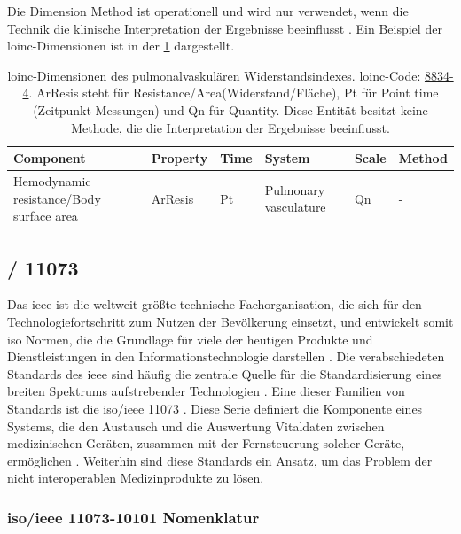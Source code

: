 Die Dimension \glqq Method\grqq{} ist operationell und wird nur verwendet, wenn die Technik die klinische Interpretation der Ergebnisse beeinflusst \cite{interop}. Ein Beispiel der \ac{loinc}-Dimensionen ist in der \ref{tab:loincdimensions} dargestellt.

\begin{table}[ht]
	\centering 
	\small 
	\caption[\acs{loinc}-Dimensionen]{\ac{loinc}-Dimensionen des pulmonalvaskulären Widerstandsindexes. \ac{loinc}-Code: \href{https://loinc.org/8834-4/}{8834-4}. ArResis steht für  Resistance/Area\grqq (Widerstand/Fläche), Pt für Point time (Zeitpunkt-Messungen) und Qn für Quantity. Diese Entität besitzt keine Methode, die die Interpretation der Ergebnisse beeinflusst.}
	\label{tab:loincdimensions}
	\begin{tabular}{|p{3cm}|l|l|p{2cm}|l|l|}
		\hline
		\rowcolor{lightgray} Component & Property & Time & System & Scale & Method \\ \hline
		Hemodynamic resistance/Body surface area & ArResis & Pt & Pulmonary vasculature & Qn & - \\ \hline	
	\end{tabular}
\end{table}

\subsection{/ 11073\texttrademark{}} \label{subsec:ieee}

Das \acf{ieee} ist die weltweit größte technische Fachorganisation, die sich für den Technologiefortschritt zum Nutzen der Bevölkerung einsetzt, und entwickelt somit \ac{iso} Normen, die die Grundlage für viele der heutigen Produkte und Dienstleistungen in den Informationstechnologie darstellen \cite{ieeeiso}. Die verabschiedeten Standards des \ac{ieee} sind häufig die zentrale Quelle für die Standardisierung eines breiten Spektrums aufstrebender Technologien \cite{ieeeglance}. Eine dieser Familien von Standards ist die \acs{iso}/\ac{ieee} 11073\texttrademark{} \cite{ieeeglance, ieeearch}. Diese Serie definiert die Komponente eines Systems, die den Austausch und die Auswertung Vitaldaten zwischen medizinischen Geräten, zusammen mit der Fernsteuerung solcher Geräte, ermöglichen \cite{ieeearch}. Weiterhin sind diese Standards ein Ansatz, um das Problem der nicht interoperablen Medizinprodukte zu lösen. 

\subsubsection{\acs{iso}/\acs{ieee} 11073-10101\texttrademark{} Nomenklatur} \label{subsub:ieee1107310101}

